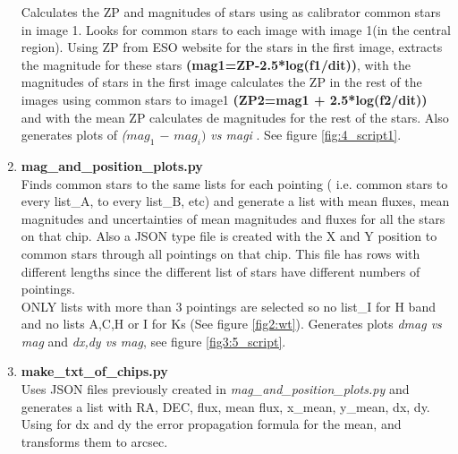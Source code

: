 \documentclass[4paper,11pt]{report}
\begin{document}
\begin{enumerate}
Calculates the ZP and magnitudes of stars using as calibrator common stars in image 1. Looks for common stars to each image with image 1(in the central region). Using ZP from ESO website for the stars in the first image, extracts the magnitude for these stars \textbf{(mag1=ZP-2.5*log(f1/dit))}, with the magnitudes of stars in the first image calculates the ZP in the rest of the images using common stars to image1 \textbf{(ZP2=mag1 + 2.5*log(f2/dit))} and with the mean ZP calculates de magnitudes for the rest of the stars. Also generates plots of \textit{($mag_{1}$ $-$  $mag_{i})$ vs magi} .  See figure \ref{fig:4_script1}.


\item \textbf{mag\_and\_position\_plots.py} \\
Finds common stars to the same lists for each pointing ( i.e. common stars to every list\_A, to every list\_B, etc)  and generate a list with mean fluxes, mean magnitudes and uncertainties of mean magnitudes and fluxes for all the stars on that chip. Also a JSON type file is created with the X and Y position to  common stars through all pointings on that chip. This file has rows with different lengths since the different list of stars have different numbers of pointings.\\
ONLY lists with more than 3 pointings are selected so no list\_I for H band and no lists A,C,H or I for Ks (See figure \ref{fig2:wt}). 
Generates plots \textit{dmag vs mag } and \textit{dx,dy vs mag}, see figure \ref{fig3:5_script}.


\item \textbf{make\_txt\_of\_chips.py } \\
Uses JSON files previously created in \textit{mag\_and\_position\_plots.py}  and generates a list with RA, DEC, flux, mean flux, x\_mean, y\_mean, dx, dy. Using for dx and dy the error propagation formula for the mean, and transforms them to arcsec.



\end{enumerate}
\end{document}
